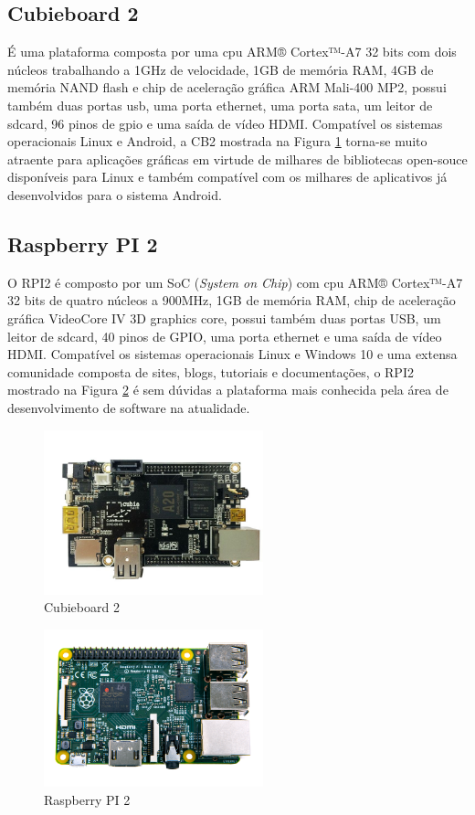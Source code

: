 \documentclass[conference]{IEEEtran}
\begin{document}
\subsection{Cubieboard 2}
É uma plataforma composta por uma cpu ARM® Cortex™-A7 32 bits com dois núcleos trabalhando a 1GHz de velocidade, 1GB de memória RAM, 4GB de memória NAND flash e chip de aceleração gráfica ARM Mali-400 MP2, possui também duas portas usb, uma porta ethernet, uma porta sata, um leitor de sdcard, 96 pinos de gpio e uma saída de vídeo HDMI. Compatível os sistemas operacionais Linux e Android, a CB2 mostrada na Figura \ref{fig:plat_cb2} torna-se muito atraente para aplicações gráficas em virtude de milhares de bibliotecas open-souce disponíveis para Linux e também compatível com os milhares de aplicativos já desenvolvidos para o sistema Android.


\subsection{Raspberry PI 2}
O RPI2  é composto por um SoC (\textit{System on Chip}) com cpu ARM® Cortex™-A7 32 bits de quatro núcleos a 900MHz, 1GB de memória RAM, chip de aceleração gráfica VideoCore IV 3D graphics core, possui também duas portas USB, um leitor de sdcard, 40 pinos de GPIO, uma porta ethernet e uma saída de vídeo HDMI. Compatível os sistemas operacionais Linux e Windows 10 e uma extensa comunidade composta de sites, blogs, tutoriais e documentações, o RPI2 mostrado na Figura \ref{fig:plat_rpi2} é sem dúvidas a plataforma mais conhecida pela área de desenvolvimento de software na atualidade.



\begin{figure}[!t]
\centering
\includegraphics[width=2.5in]{cubieboard2}
\caption{Cubieboard 2}
\label{fig:plat_cb2}
\end{figure}

\begin{figure}[!t]
\centering
\includegraphics[width=2.5in]{RaspberryPi2}
\caption{Raspberry PI 2}
\label{fig:plat_rpi2}
\end{figure}
\end{document}
